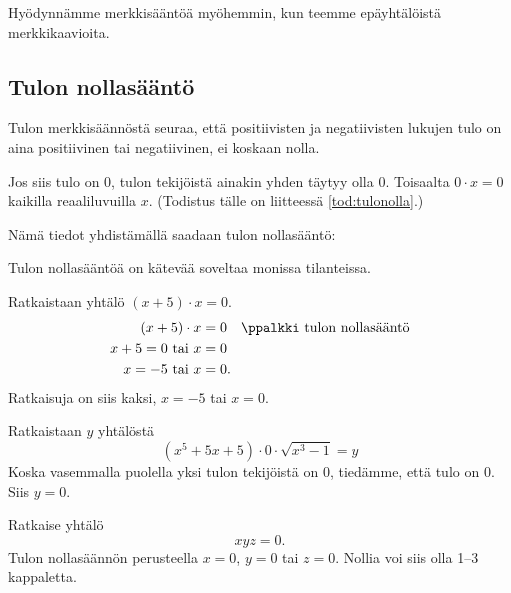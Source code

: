 Hyödynnämme merkkisääntöä myöhemmin, kun teemme epäyhtälöistä merkkikaavioita.

\subsection*{Tulon nollasääntö}

Tulon merkkisäännöstä seuraa, että positiivisten ja negatiivisten lukujen tulo on aina positiivinen tai negatiivinen, ei koskaan nolla.

Jos siis tulo on $0$, tulon tekijöistä ainakin yhden täytyy olla $0$. Toisaalta $0\cdot x = 0$ kaikilla reaaliluvuilla $x$.
(Todistus tälle on liitteessä \ref{tod:tulonolla}.)

Nämä tiedot yhdistämällä saadaan tulon nollasääntö:


Tulon nollasääntöä on kätevää soveltaa monissa tilanteissa.

\begin{esimerkki} Ratkaistaan yhtälö $(x+5) \cdot x =0 $.
    \begin{align*}
        (x+5)\cdot x &=0 \quad \ppalkki \text{ tulon nollasääntö} \\
        x +5= 0 \text{ tai } x &=0 \\
        x= -5 \text{ tai } x &=0.
    \end{align*}
    Ratkaisuja on siis kaksi, $x= -5$ tai $x= 0$.
\end{esimerkki}


\begin{esimerkki} Ratkaistaan $y$ yhtälöstä
    \[(x^5+5x+5)\cdot 0\cdot \sqrt{x^3-1} =y\]
    Koska vasemmalla puolella yksi tulon tekijöistä on $0$, tiedämme, että tulo on $0$. Siis $y=0$.
\end{esimerkki}

\begin{esimerkki} Ratkaise yhtälö
    \[xyz=0.\]
Tulon nollasäännön perusteella $x=0$, $y=0$ tai $z=0$. Nollia voi siis
olla 1--3 kappaletta.
\end{esimerkki}

